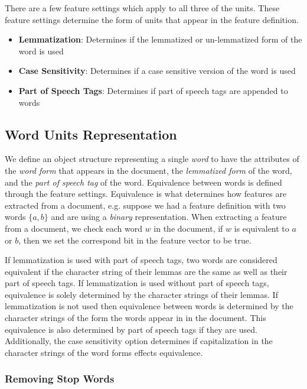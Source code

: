 \documentclass[11pt]{article}
\begin{document}
There are a few feature settings which apply to all three of the units. These feature settings determine the form of units that appear in the feature definition. 

\begin{itemize}
 \item \textbf{Lemmatization}: Determines if the lemmatized or un-lemmatized form of the word is used
 \item \textbf{Case Sensitivity}: Determines if a case sensitive version of the word is used
 \item \textbf{Part of Speech Tags}: Determines if part of speech tags are appended to words
 \end{itemize}
 
 
\subsection{Word Units Representation}

We define an object structure representing a single \emph{word} to have the attributes of the \emph{word form} that appears in the document, the \emph{lemmatized form} of the word, and the \emph{part of speech tag} of the word. Equivalence between words is defined through the feature settings. Equivalence is what determines how features are extracted from a document, e.g. suppose we had a feature definition with two words $\{a,b\}$ and are using a \textit{binary} representation. When extracting a feature from a document, we check each word $w$ in the document, if $w$ is equivalent to $a$ or $b$, then we set the correspond bit in the feature vector to be true. 

If lemmatization is used with part of speech tags, two words are considered equivalent if the character string of their lemmas are the same as well as their part of speech tags. If lemmatization is used without part of speech tags, equivalence is solely determined by the character strings of their lemmas.  If lemmatization is not used then equivalence between words is determined by the character strings of the form the words appear in in the document. This equivalence is also determined by part of speech tags if they are used. Additionally, the case sensitivity option determines if capitalization in the character strings of the word forms effects equivalence. 

\subsubsection{Removing Stop Words}
\end{document}
